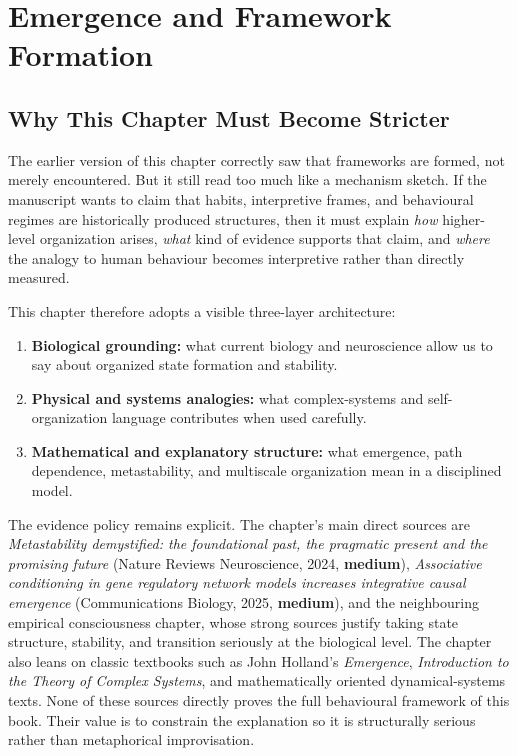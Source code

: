 \chapter{Emergence and Framework Formation}
\label{ch:emergence}

\section{Why This Chapter Must Become Stricter}

The earlier version of this chapter correctly saw that frameworks are formed,
not merely encountered. But it still read too much like a mechanism sketch. If
the manuscript wants to claim that habits, interpretive frames, and behavioural
regimes are historically produced structures, then it must explain
\emph{how} higher-level organization arises, \emph{what} kind of evidence
supports that claim, and \emph{where} the analogy to human behaviour becomes
interpretive rather than directly measured.

This chapter therefore adopts a visible three-layer architecture:
\begin{enumerate}[nosep]
  \item \textbf{Biological grounding:} what current biology and neuroscience
        allow us to say about organized state formation and stability.
  \item \textbf{Physical and systems analogies:} what complex-systems and
        self-organization language contributes when used carefully.
  \item \textbf{Mathematical and explanatory structure:} what emergence,
        path dependence, metastability, and multiscale organization mean in a
        disciplined model.
\end{enumerate}

The evidence policy remains explicit. The chapter's main direct sources are
\emph{Metastability demystified: the foundational past, the pragmatic present
and the promising future} (Nature Reviews Neuroscience, 2024, \textbf{medium}),
\emph{Associative conditioning in gene regulatory network models increases
integrative causal emergence} (Communications Biology, 2025, \textbf{medium}),
and the neighbouring empirical consciousness chapter, whose strong sources
justify taking state structure, stability, and transition seriously at the
biological level. The chapter also leans on classic textbooks such as John
Holland's \emph{Emergence}, \emph{Introduction to the Theory of Complex
Systems}, and mathematically oriented dynamical-systems texts. None of these
sources directly proves the full behavioural framework of this book. Their
value is to constrain the explanation so it is structurally serious rather than
metaphorical improvisation.

